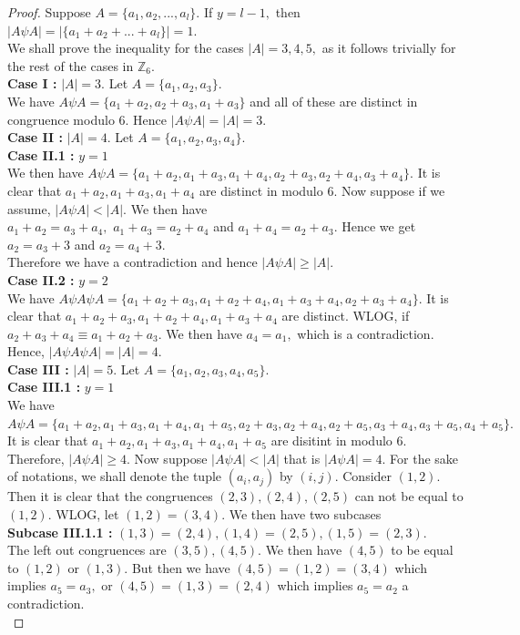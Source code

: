 \documentclass[reqno,10pt]{amsart}
\begin{document}
\begin{proof}
Suppose $A = \{a_1,a_2,...,a_l\}$. If $y=l-1,$ then  $ |A \psi A |= | \{a_1+a_2+...+a_l\}| = 1.$\\
We shall prove the inequality for the cases $ |A|=3,4,5,$ as it follows trivially for the rest of the cases in $ \mathbb{Z}_6.$\\
\textbf{Case I :} $|A|=3.$ Let $A = \{a_1,a_2,a_3\}.$ \\
We have $A \psi A = \{a_1+a_2,a_2+a_3,a_1+a_3\}$ and all of these are distinct in congruence modulo $6.$ Hence $|A \psi A|=|A|=3.$\\
\textbf{Case II : } $|A|=4.$ Let $A = \{a_1,a_2,a_3,a_4\}. $ \\
\textbf{Case II.1 : } $y=1$\\
We then have $ A \psi A = \{ a_1+a_2,a_1+a_3,a_1+a_4,a_2+a_3,a_2+a_4,a_3+a_4 \}.$ It is clear that $a_1+a_2,a_1+a_3,a_1+a_4$ are distinct in modulo $6.$ Now suppose if we assume, $| A \psi A| < |A|$. We then have \\
$a_1+a_2 = a_3 + a_4,$ $a_1 + a_3 = a_2 + a_4$ and $a_1 + a_4 = a_2 + a_3.$ Hence
we get $a_2 = a_3 + 3 $ and $a_2 = a_4 + 3 .$\\
Therefore we have a contradiction and hence $ |A \psi A| \geq |A|.$\\
\textbf{Case II.2 :} $y=2$\\
We have $ A \psi A \psi A = \{ a_1+a_2+a_3,a_1+a_2+a_4, a_1+a_3+a_4, a_2+a_3+a_4 \}.$ It is clear that $ a_1+a_2+a_3, a_1+a_2+a_4, a_1+a_3+a_4$ are distinct. WLOG, if $ a_2+a_3+a_4 \equiv a_1+a_2+a_3. $ We then have $ a_4 = a_1,$ which is a contradiction. Hence, $|A \psi A \psi A| = |A|=4.$\\
\textbf{Case III : } $|A|=5.$ Let $ A = \{a_1,a_2,a_3,a_4,a_5\} .$\\ 
\textbf{Case III.1 :} $y=1$\\
We have $A \psi A = \{a_1+a_2,a_1+a_3,a_1+a_4,a_1+a_5,a_2+a_3,a_2+a_4,a_2+a_5,a_3+a_4,a_3+a_5,a_4+a_5 \}.$ It is clear that $a_1+a_2,a_1+a_3,a_1+a_4,a_1+a_5 $ are disitint in modulo $6.$ Therefore, $|A \psi A| \geq 4.$ Now suppose  $|A \psi A| < |A|$ that is $|A \psi A|=4.$ For the sake of notations, we shall denote the tuple $(a_i,a_j)$ by $(i,j).$ Consider $(1,2).$ Then it is clear that the congruences $(2,3),(2,4),(2,5)$ can not be equal to $(1,2).$ WLOG, let $(1,2)=(3,4).$ We then have two subcases \\
\textbf{Subcase III.1.1 : } $ (1,3)=(2,4), (1,4)=(2,5), (1,5)=(2,3).$ \\
The left out congruences are $(3,5),(4,5).$ We then have $(4,5)$ to be equal to $(1,2)$ or $(1,3).$ But then we have $(4,5)=(1,2)=(3,4)$ which implies $a_5 = a_3,$ or $(4,5)=(1,3)=(2,4)$ which implies $a_5=a_2$  a contradiction.\\

\end{proof}
\end{document}
